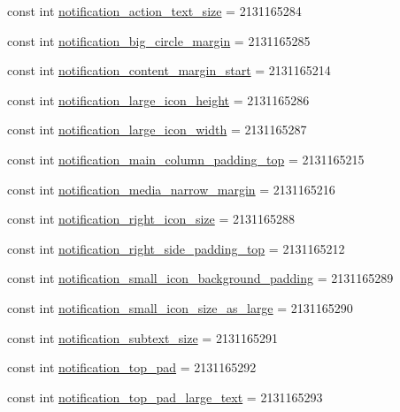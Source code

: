 \begin{DoxyCompactItemize}
\item 
const int \mbox{\hyperlink{class_f_w_p_s___app_1_1_droid_1_1_resource_1_1_dimension_a577cb3c1026eb88ddada1e1261ec512d}{notification\+\_\+action\+\_\+text\+\_\+size}} = 2131165284
\item 
const int \mbox{\hyperlink{class_f_w_p_s___app_1_1_droid_1_1_resource_1_1_dimension_adde78f1633b0c689ea2c87757723743b}{notification\+\_\+big\+\_\+circle\+\_\+margin}} = 2131165285
\item 
const int \mbox{\hyperlink{class_f_w_p_s___app_1_1_droid_1_1_resource_1_1_dimension_a0410ab7d7766834d7385ea7264d5b624}{notification\+\_\+content\+\_\+margin\+\_\+start}} = 2131165214
\item 
const int \mbox{\hyperlink{class_f_w_p_s___app_1_1_droid_1_1_resource_1_1_dimension_a6d06c36ecdba0333501234b784e2729b}{notification\+\_\+large\+\_\+icon\+\_\+height}} = 2131165286
\item 
const int \mbox{\hyperlink{class_f_w_p_s___app_1_1_droid_1_1_resource_1_1_dimension_a1074798f80f8ee3010b629ad17d3ee6d}{notification\+\_\+large\+\_\+icon\+\_\+width}} = 2131165287
\item 
const int \mbox{\hyperlink{class_f_w_p_s___app_1_1_droid_1_1_resource_1_1_dimension_a93760cc013f6801e08d3c4146b20619d}{notification\+\_\+main\+\_\+column\+\_\+padding\+\_\+top}} = 2131165215
\item 
const int \mbox{\hyperlink{class_f_w_p_s___app_1_1_droid_1_1_resource_1_1_dimension_af2ba55305b6f9b1da29e0ecf02119212}{notification\+\_\+media\+\_\+narrow\+\_\+margin}} = 2131165216
\item 
const int \mbox{\hyperlink{class_f_w_p_s___app_1_1_droid_1_1_resource_1_1_dimension_ac630aea9167607ff5fa4031cb300f359}{notification\+\_\+right\+\_\+icon\+\_\+size}} = 2131165288
\item 
const int \mbox{\hyperlink{class_f_w_p_s___app_1_1_droid_1_1_resource_1_1_dimension_a3f4d9c4179fdb4cb027f75f089b08c60}{notification\+\_\+right\+\_\+side\+\_\+padding\+\_\+top}} = 2131165212
\item 
const int \mbox{\hyperlink{class_f_w_p_s___app_1_1_droid_1_1_resource_1_1_dimension_a6e1d7a7530b648326ec1e3fbd9610bee}{notification\+\_\+small\+\_\+icon\+\_\+background\+\_\+padding}} = 2131165289
\item 
const int \mbox{\hyperlink{class_f_w_p_s___app_1_1_droid_1_1_resource_1_1_dimension_aadf70e13493451f247570e72eaa611d8}{notification\+\_\+small\+\_\+icon\+\_\+size\+\_\+as\+\_\+large}} = 2131165290
\item 
const int \mbox{\hyperlink{class_f_w_p_s___app_1_1_droid_1_1_resource_1_1_dimension_a1d72617bcc7c385666afae65b32475bc}{notification\+\_\+subtext\+\_\+size}} = 2131165291
\item 
const int \mbox{\hyperlink{class_f_w_p_s___app_1_1_droid_1_1_resource_1_1_dimension_a88b2dd1048dda490e745c610c1369902}{notification\+\_\+top\+\_\+pad}} = 2131165292
\item 
const int \mbox{\hyperlink{class_f_w_p_s___app_1_1_droid_1_1_resource_1_1_dimension_aa19a1ee0c7427d40f5a8ba6b34f9d6e0}{notification\+\_\+top\+\_\+pad\+\_\+large\+\_\+text}} = 2131165293
\end{DoxyCompactItemize}
